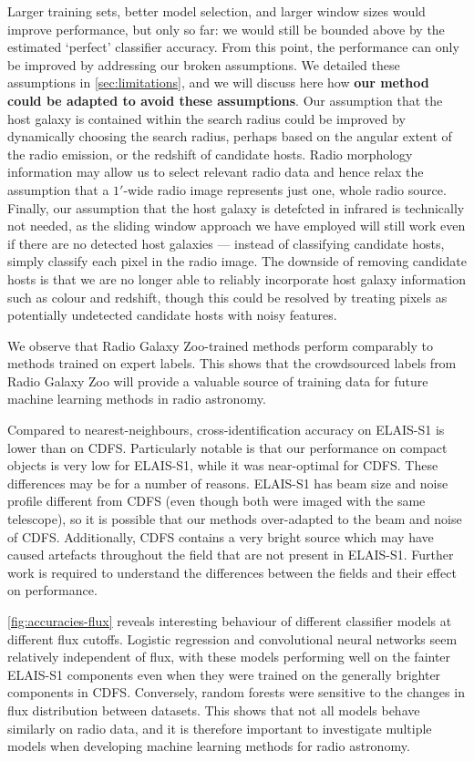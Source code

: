 \documentclass[fleqn,usenatbib,usedcolumn]{mnras}
\newcommand{\edited}[1]{{\bf {#1}}}
\begin{document}
  Larger training sets, better model selection, and larger window sizes would
  improve performance, but only so far: we would still be bounded above by the
  estimated `perfect' classifier accuracy. From this point, the performance
  can only be improved by addressing our broken assumptions. We detailed
  these assumptions in \autoref{sec:limitations}, and we will discuss here how
  \edited{our method could be adapted to avoid these assumptions}. Our assumption that the host galaxy is contained
  within the search radius could be improved by dynamically choosing the
  search radius, perhaps based on the angular extent of the radio emission, or the
  redshift of candidate hosts. Radio morphology information may allow us to
  select relevant radio data and hence relax the assumption that a $1'$-wide
  radio image represents just one, whole radio source. Finally, our assumption
  that the host galaxy is detefcted in infrared is technically not needed, as
  the sliding window approach we have employed will still work even if there
  are no detected host galaxies --- instead of classifying candidate hosts,
  simply classify each pixel in the radio image. The downside of removing
  candidate hosts is that we are no longer able to reliably incorporate host
  galaxy information such as colour and redshift, though this could be
  resolved by treating pixels as potentially undetected candidate hosts with
  noisy features.

  We observe that Radio Galaxy Zoo-trained methods perform comparably to
  methods trained on expert labels. This shows that the crowdsourced labels
  from Radio Galaxy Zoo will provide a valuable source of training
  data for future machine learning methods in radio astronomy.

  Compared to nearest-neighbours, cross-identification accuracy on ELAIS-S1 is
  lower than on CDFS. Particularly notable is that our performance on compact
  objects is very low for ELAIS-S1, while it was near-optimal for CDFS. These
  differences may be for a number of reasons. ELAIS-S1 has beam size and noise
  profile different from CDFS (even though both were imaged with the same
  telescope), so it is possible that our methods over-adapted to the beam and
  noise of CDFS. Additionally, CDFS contains a very bright source which may
  have caused artefacts throughout the field that are not present in ELAIS-S1.
  Further work is required to understand the differences between the fields
  and their effect on performance.

  \autoref{fig:accuracies-flux} reveals interesting behaviour of different
  classifier models at different flux cutoffs. Logistic regression and
  convolutional neural networks seem relatively independent of flux, with
  these models performing well on the fainter ELAIS-S1 components even when
  they were trained on the generally brighter components in CDFS. Conversely,
  random forests were sensitive to the changes in flux distribution between
  datasets. This shows that not all models behave similarly on radio data,
  and it is therefore important to investigate multiple models when
  developing machine learning methods for radio astronomy.
\end{document}
